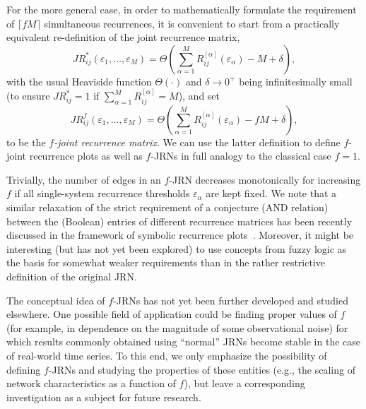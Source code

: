 		For the more general case, in order to mathematically formulate the requirement of $\lceil f M \rceil$ simultaneous recurrences, it is convenient to start from a practically equivalent re-definition of the joint recurrence matrix,
\begin{equation}
JR^*_{ij}(\varepsilon_1,\dots,\varepsilon_M) = \Theta\left( \sum_{\alpha=1}^M R_{ij}^{[\alpha]}(\varepsilon_\alpha) -M+\delta \right),
\end{equation}
\noindent
with the usual Heaviside function $\Theta(\cdot)$ and $\delta\to 0^+$ being infinitesimally small (to ensure $JR^*_{ij}=1$ if $\sum_{\alpha=1}^M R_{ij}^{[\alpha]} = M$), and set
\begin{equation}
JR^{f}_{ij}(\varepsilon_1,\dots,\varepsilon_M) = \Theta\left( \sum_{\alpha=1}^M R_{ij}^{[\alpha]}(\varepsilon_\alpha) - f M+\delta \right),
\end{equation}
\noindent
to be the \emph{$f$-joint recurrence matrix}. We can use the latter definition to define $f$-joint recurrence plots as well as $f$-JRNs in full analogy to the classical case $f =1$.

		Trivially, the number of edges in an $f$-JRN decreases monotonically for increasing $f$ if all single-system recurrence thresholds $\varepsilon_\alpha$ are kept fixed. We note that a similar relaxation of the strict requirement of a conjecture (AND relation) between the (Boolean) entries of different recurrence matrices has been recently discussed in the framework of symbolic recurrence plots~\cite{Donner2008}. Moreover, it might be interesting (but has not yet been explored) to use concepts from fuzzy logic as the basis for somewhat weaker requirements than in the rather restrictive definition of the original JRN.

		The conceptual idea of $f$-JRNs has not yet been further developed and studied elsewhere. One possible field of application could be finding proper values of $f$ (for example, in dependence on the magnitude of some observational noise) for which results commonly obtained using ``normal'' JRNs become stable in the case of real-world time series. To this end, we only emphasize the possibility of defining $f$-JRNs and studying the properties of these entities (e.g., the scaling of network characteristics as a function of $f$), but leave a corresponding investigation as a subject for future research.



